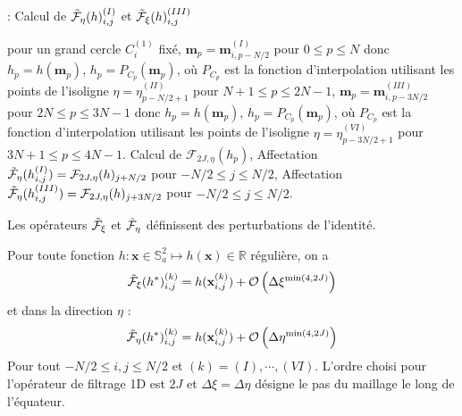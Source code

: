 \begin{center}
\begin{minipage}[H]{12cm}
  \begin{algorithm}[H]
    \caption{: Calcul de $\tilde{\mathcal{F}}_{\eta}(h)_{i,j}^{(I)}$ et $\tilde{\mathcal{F}}_{\xi}(h)_{i,j}^{(III)}$}\label{alg:ftreta}
    \begin{algorithmic}[1]
    \State pour un grand cercle $C_i^{(1)}$ fixé,
             \State  $\mathbf{m}_p = \mathbf{m}_{i,p-N/2}^{(I)}$ pour $0  \leq p \leq N$ donc $h_p = h(\mathbf{m}_p)$,
             \State $h_p = P_{C_p}(\mathbf{m}_p)$, où $P_{C_p}$ est la fonction d'interpolation utilisant les points de l'isoligne $\eta = \eta^{(II)}_{p-N/2+1}$ pour $N+1 \leq p \leq 2N-1$,
             \State  $\mathbf{m}_p = \mathbf{m}_{i,p-3N/2}^{(III)}$ pour $2N  \leq p \leq 3N-1$ donc $h_p = h(\mathbf{m}_p)$,
             \State $h_p = P_{C_p}(\mathbf{m}_p)$, où $P_{C_p}$ est la fonction d'interpolation utilisant les points de l'isoligne $\eta = \eta^{(VI)}_{p-3N/2+1}$ pour $3N+1 \leq p \leq 4N-1$.
            \EndFor
    \State Calcul de $\mathcal{F}_{2J,\eta}(h_p)$,
    \State Affectation $\tilde{\mathcal{F}}_{\eta}(h_{i,j}^{(I)}) = \mathcal{F}_{2J,\eta}(h)_{j+N/2}$ pour $-N/2 \leq j \leq N/2$,
    \State Affectation $\tilde{\mathcal{F}}_{\eta}(h_{i,j}^{(III)}) = \mathcal{F}_{2J,\eta}(h)_{j+3N/2}$ pour $-N/2 \leq j \leq N/2$.
    \EndFor
    \end{algorithmic}
    \end{algorithm}
\end{minipage}
\end{center}
Les opérateurs $\tilde{\mathcal{F}}_{\xi}$ et $\tilde{\mathcal{F}}_{\eta}$ définissent des perturbations de l'identité.
\begin{proposition}
Pour toute fonction $h : \mathbf{x} \in \mathbb{S}_a^2 \mapsto h(\mathbf{x}) \in \mathbb{R}$ régulière, on a 
\begin{equation}
\tilde{\mathcal{F}}_{\xi}(h^*)_{i,j}^{(k)} = h(\mathbf{x}_{i,j}^{(k)}) + \mathcal{O}\left( \Delta \xi^{\min(4,2J)} \right)
\label{eq:consistance_fxi}
\end{equation}
et dans la direction $\eta$ :
\begin{equation}
\tilde{\mathcal{F}}_{\eta}(h^*)_{i,j}^{(k)} = h(\mathbf{x}_{i,j}^{(k)}) + \mathcal{O}\left( \Delta \eta^{\min(4,2J)} \right)
\label{eq:consistance_feta}
\end{equation}
Pour tout $-N/2 \leq i,j \leq N/2$ et $(k) = (I), \cdots , (VI)$. L'ordre choisi pour l'opérateur de filtrage 1D est $2J$ et $\Delta \xi = \Delta \eta$ désigne le pas du maillage le long de l'équateur.
\label{prop:consistance_ftrdir}
\end{proposition}

